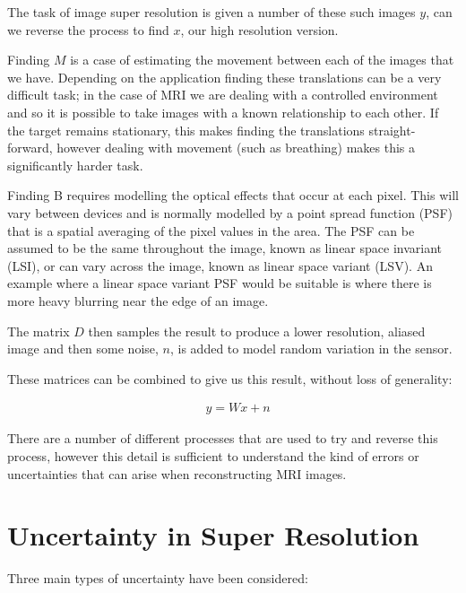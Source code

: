 The task of image super resolution is given a number of these such images $y$, can we reverse the process to find $x$, our high resolution version.

Finding $M$ is a case of estimating the movement between each of the images that we have. Depending on the application finding these translations can be a very difficult task; in the case of MRI we are dealing with a controlled environment and so it is possible to take images with a known relationship to each other. If the target remains stationary, this makes finding the translations straight-forward, however dealing with movement (such as breathing) makes this a significantly harder task.

Finding B requires modelling the optical effects that occur at each pixel. This will vary between devices and is normally modelled by a point spread function (PSF) that is a spatial averaging of the pixel values in the area. The PSF can be assumed to be the same throughout the image, known as linear space invariant (LSI), or can vary across the image, known as linear space variant (LSV). An example where a linear space variant PSF would be suitable is where there is more heavy blurring near the edge of an image.

The matrix $D$ then samples the result to produce a lower resolution, aliased image and then some noise, $n$, is added to model random variation in the sensor.

These matrices can be combined to give us this result, without loss of generality:

\begin{align}
& y = Wx + n \nonumber
\end{align}

There are a number of different processes that are used to try and reverse this process, however this detail is sufficient to understand the kind of errors or uncertainties that can arise when reconstructing MRI images.

\newpage
\section{Uncertainty in Super Resolution}\label{background:uncertainty}
Three main types of uncertainty have been considered:

